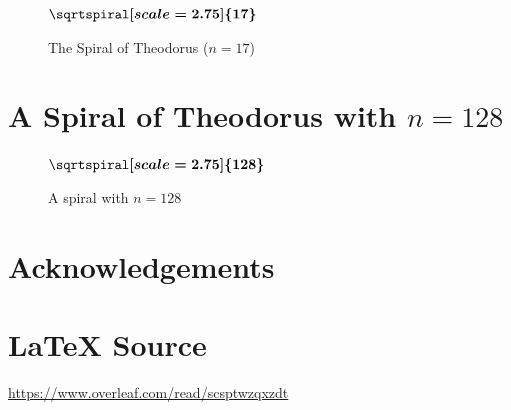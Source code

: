 \documentclass{article}
\theoremstyle{definition}
\begin{document}
{                                                           %
}                                                                               %
%
%
%
\def \numberoftriangles {17}													%
%
%
%
\bigskip
\begin{figure}[H]																%
        \centering																%
        \resizebox{0.60 \textwidth}{!} {                                        %
        	$\boldmath{\sqrtspiral[scale=2.75]{\numberoftriangles}}$			%
        }                                                                       %
\caption{The Spiral of Theodorus ($n = \numberoftriangles$)}
\label{fig:the_spiral_of_theodorus}
\end{figure}
%
%
\def \numberoftriangles {128}													%
%
%
%
\section{A Spiral of Theodorus with $n = \numberoftriangles$}
%
%
%
\bigskip
\begin{figure}[H]																%
        \centering																%
        \resizebox{0.75 \textwidth}{!} {                                        %
        	$\boldmath{\sqrtspiral[scale=2.75]{\numberoftriangles}}$			%
        }                                                                       %
\caption{A spiral with $n = \numberoftriangles$}
\end{figure}
%
%
%
%
%
%
\bigskip
\section*{Acknowledgements}
%
%
\section*{\LaTeX \hspace{0.10 mm} Source}
\url{https://www.overleaf.com/read/scsptwzqxzdt}
%
%
%


%
%
\end{document}
